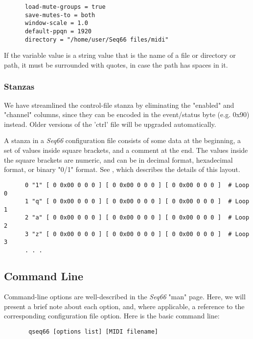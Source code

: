    \begin{verbatim}
      load-mute-groups = true
      save-mutes-to = both
      window-scale = 1.0
      default-ppqn = 1920
      directory = "/home/user/Seq66 files/midi"
   \end{verbatim}

   If the variable value is a string value that is the name of a file or
   directory or path, it must be surrounded with quotes, in case the path has
   spaces in it.

\subsubsection{Stanzas}
\label{subsec:configuration_common_stanzas}

   We have streamlined the control-file stanza by eliminating the "enabled" and
   "channel" columns, since they can be encoded in the event/status
   byte (e.g. 0x90) instead.  Older versions of the 'ctrl' file will be
   upgraded automatically.

   A stanza in a \textsl{Seq66} configuration file consists of some data at the
   beginning, a set of values inside square brackets, and a comment
   at the end.  The values inside the square brackets are numeric, and can
   be in decimal format, hexadecimal format, or binary "0/1" format.
   See , which describes
   the details of this layout.

   \begin{verbatim}
      0 "1" [ 0 0x00 0 0 0 ] [ 0 0x00 0 0 0 ] [ 0 0x00 0 0 0 ]  # Loop 0
      1 "q" [ 0 0x00 0 0 0 ] [ 0 0x00 0 0 0 ] [ 0 0x00 0 0 0 ]  # Loop 1
      2 "a" [ 0 0x00 0 0 0 ] [ 0 0x00 0 0 0 ] [ 0 0x00 0 0 0 ]  # Loop 2
      3 "z" [ 0 0x00 0 0 0 ] [ 0 0x00 0 0 0 ] [ 0 0x00 0 0 0 ]  # Loop 3
      . . .
   \end{verbatim}

\subsection{Command Line}
\label{subsec:configuration_command_line}

   Command-line options are well-described in the \textsl{Seq66} "man" page.
   Here, we will present a brief note about each option, and, where applicable, a
   reference to the corresponding configuration file option.
   Here is the basic command line:

   \begin{verbatim}
       qseq66 [options list] [MIDI filename]
   \end{verbatim}


